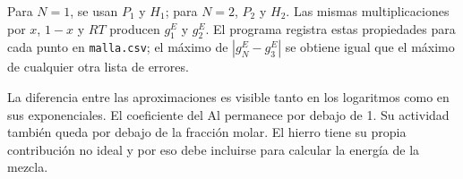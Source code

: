 

Para $N=1$, se usan $P_1$ y $H_1$; para $N=2$, $P_2$ y $H_2$. Las mismas multiplicaciones por $x$, $1-x$ y $RT$ producen $g_1^E$ y $g_2^E$. El programa registra estas propiedades para cada punto en \texttt{malla.csv}; el máximo de $|g_N^E-g_3^E|$ se obtiene igual que el máximo de cualquier otra lista de errores.



La diferencia entre las aproximaciones es visible tanto en los logaritmos como en sus exponenciales. El coeficiente del Al permanece por debajo de 1. Su actividad también queda por debajo de la fracción molar. El hierro tiene su propia contribución no ideal y por eso debe incluirse para calcular la energía de la mezcla.
